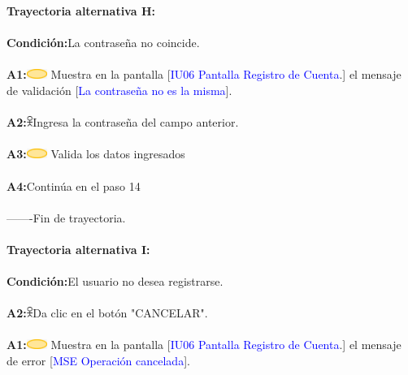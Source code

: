                     \textbf{Trayectoria alternativa H:}\\\\
                        \textbf{Condición:}La contraseña no coincide.\\\\
                        \textbf{A1:}\includegraphics[width=0.0500\textwidth]{Figuras/sistema.png} Muestra en la pantalla [\textcolor{blue}{IU06 Pantalla Registro de Cuenta}.] el mensaje de validación [\textcolor{blue}{La contraseña no es la misma}].  \\\\  
                        \textbf{A2:}\includegraphics[width=0.0150\textwidth]{Figuras/persona.png}Ingresa la contraseña del campo anterior.\\\\
                        \textbf{A3:}\includegraphics[width=0.0500\textwidth]{Figuras/sistema.png} Valida los datos ingresados\\\\
                        \textbf{A4:}Continúa en el paso 14 \\\\
       
        -------Fin de  trayectoria. \\\\

                    \textbf{Trayectoria alternativa I:}\\\\
                        \textbf{Condición:}El usuario no desea registrarse.\\\\
                        \textbf{A2:}\includegraphics[width=0.0150\textwidth]{Figuras/persona.png}Da clic en el botón "CANCELAR".\\\\
                        \textbf{A1:}\includegraphics[width=0.0500\textwidth]{Figuras/sistema.png} Muestra en la pantalla [\textcolor{blue}{IU06 Pantalla Registro de Cuenta}.] el mensaje de error [\textcolor{blue}{MSE Operación cancelada}].  \\\\
                        
